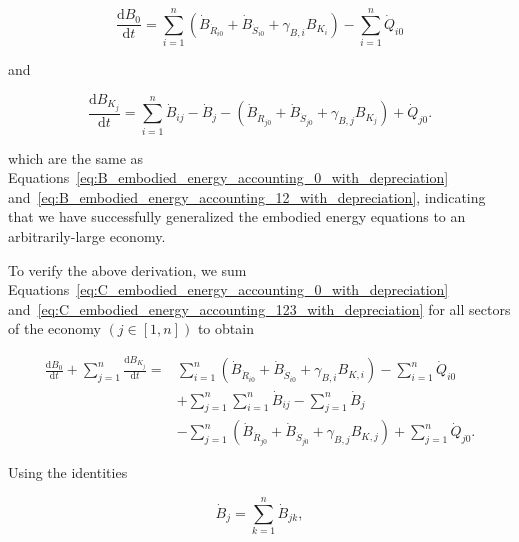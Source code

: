 \begin{equation} \label{eq:C_embodied_energy_accounting_0_with_depreciation}
	\frac{\mathrm{d}B_{0}}{\mathrm{d}t} 
	= \sum\limits_{i=1}^n 
		\left( \dot{B}_{\dot{R}_{i0}} 
				+ \dot{B}_{\dot{S}_{i0}} 
				+ \gamma_{B,i} B_{K_{i}} \right)
	- \sum\limits_{i=1}^n\dot{Q}_{i0} 
\end{equation}

\noindent and

\begin{equation} \label{eq:C_embodied_energy_accounting_123_with_depreciation}
	\frac{\mathrm{d}B_{K_{j}}}{\mathrm{d}t} 
	= \sum\limits_{i=1}^n\dot{B}_{ij} 
	- \dot{B}_{j}
	- \left( \dot{B}_{\dot{R}_{j0}}
		+ \dot{B}_{\dot{S}_{j0}}
		+ \gamma_{B,j} B_{K_{j}} \right)
	+ \dot{Q}_{j0}.
\end{equation}

\noindent which are the same as 
Equations~\ref{eq:B_embodied_energy_accounting_0_with_depreciation}
and~\ref{eq:B_embodied_energy_accounting_12_with_depreciation},
indicating that we have successfully generalized the embodied energy
equations to an arbitrarily-large economy.

To verify the above derivation, 
we sum 
Equations~\ref{eq:C_embodied_energy_accounting_0_with_depreciation} 
and~\ref{eq:C_embodied_energy_accounting_123_with_depreciation} 
for all sectors of the economy $\left( j \in [1,n] \right)$ to obtain

\begin{equation} \label{eq:C_big_sums}
	\begin{split}
		\frac{\mathrm{d}B_{0}}{\mathrm{d}t} 
		+ \sum\limits_{j=1}^n \frac{\mathrm{d}B_{K_{j}}}{\mathrm{d}t} 
		= & 
		 \sum\limits_{i=1}^n 
			\left( \dot{B}_{\dot{R}_{i0}} 
					+ \dot{B}_{\dot{S}_{i0}} 
					+ \gamma_{B,i} B_{K,i} \right)
		- \sum\limits_{i=1}^n \dot{Q}_{i0} \\
		& + \sum\limits_{j=1}^n \sum\limits_{i=1}^n \dot{B}_{ij}
		- \sum\limits_{j=1}^n \dot{B}_{j}	\\
		& - \sum\limits_{j=1}^n
				\left( \dot{B}_{\dot{R}_{j0}}
					+ \dot{B}_{\dot{S}_{j0}}
					+ \gamma_{B,j} B_{K,j} \right)
		+ \sum\limits_{j=1}^n \dot{Q}_{j0}.
	\end{split}
\end{equation}

\noindent{}Using the identities

\begin{equation} \label{eq:B_identity_1}
	\dot{B}_{j}  
	= \sum\limits_{k=1}^n \dot{B}_{jk},
\end{equation} 

